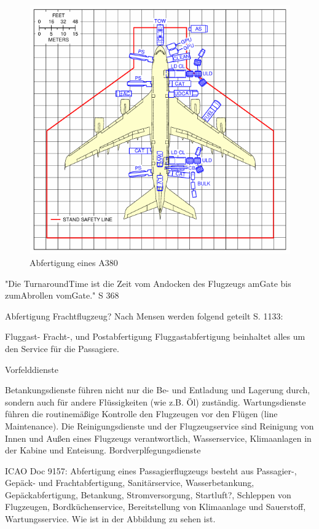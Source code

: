\begin{figure}[h]
	\centering
	\includegraphics[width=0.8\linewidth]{Bilder/A380.png}
	\caption[Abfertigung A380]{Abfertigung eines A380 \cite{AirbusA380Characteristics}}
	\label{abfertigung}
\end{figure}


"Die
TurnaroundTime ist die Zeit vom Andocken des Flugzeugs amGate bis zumAbrollen
vomGate." \cite{conrady2019luftverkehr} S 368

Abfertigung Frachtflugzeug?
Nach Mensen werden folgend geteilt S. 1133:

Fluggast- Fracht-, und Postabfertigung 
Fluggastabfertigung beinhaltet alles um den Service für die Passagiere.

Vorfelddienste

Betankungsdienste führen nicht nur die Be- und Entladung und Lagerung durch, sondern auch für andere Flüssigkeiten (wie z.B. Öl) zuständig.
Wartungsdienste führen die routinemäßige Kontrolle den Flugzeugen vor den Flügen (line Maintenance).
Die Reinigungsdienste und der Flugzeugservice sind Reinigung von Innen und Außen eines Flugzeugs verantwortlich, Wasserservice, 
Klimaanlagen in der Kabine und Enteisung.
Bordverplfegungsdienste

ICAO Doc 9157: Abfertigung eines Passagierflugzeugs besteht aus Passagier-, Gepäck- und Frachtabfertigung, Sanitärservice, Wasserbetankung, Gepäckabfertigung, Betankung, Stromversorgung,
Startluft?, Schleppen von Flugzeugen, Bordküchenservice, Bereitstellung von Klimaanlage und Sauerstoff, Wartungsservice. Wie ist in der Abbildung zu sehen ist.

